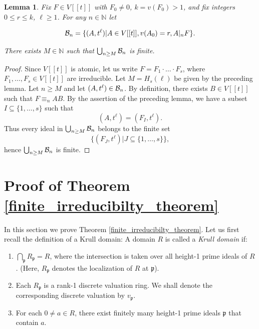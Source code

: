 \documentclass{article}
\newcommand{\N}{\mathbb{N}}
\newcommand{\st}{{|}}
\newcommand{\frp}{\mathfrak{p}}
\theoremstyle{plain}
\newtheorem{lemma}[theorem]{Lemma}
\theoremstyle{definition}
\theoremstyle{remark}
\theoremstyle{plain}
\begin{document}
\begin{lemma}\label{local_bound} Fix $F \in V[[t]]$ with $F_0 \neq 0$, $k = v(F_0) > 1$, and fix  integers $0 \leq r  \leq k$, $\ell \geq 1$. For any $n \in \N$ let 

$${\cal{B}}_n = \{(A,t^\ell) \st A\in V[[t]], v(A_0) = r, A|_nF\}.$$

There exists $M \in \N$ such that $\bigcup_{n \geq M}{\cal{B}}_n$ is finite. \end{lemma}
\begin{proof}
    Since $V[[t]]$ is atomic, let us write $F = F_1\cdot \ldots \cdot F_s$, where $F_1,\ldots,F_s \in V[[t]]$ are irreducible. Let $M = H_s(\ell)$ be given by the preceding lemma. Let $n \geq M$ and let $(A,t^\ell) \in {\cal{B}}_n$. By definition, there exists $B \in V[[t]]$ such that $F \equiv_n AB$. By the assertion of the preceding lemma, we have a subset $I \subseteq \{1,\ldots,s\}$ such that $$(A,t^\ell) = (F_I,t^\ell).$$ Thus every ideal in $\bigcup_{n \geq M}{\cal{B}}_n$ belongs to the finite set $$\{(F_J,t^\ell) \st J \subseteq \{1,\ldots,s\}\},$$  hence $\bigcup_{n \geq M}{\cal{B}}_n$ is finite. 
    
\end{proof}

\section{Proof of Theorem \ref{finite_irreducibilty_theorem}}\label{sec:krull_proof}

In this section we prove Theorem \ref{finite_irreducibilty_theorem}. Let us first recall the definition of a Krull domain: A domain $R$ is called a {\it Krull domain} if:
\begin{enumerate}
    \item $\bigcap_{\frp} R_\frp = R$, where the intersection is taken over all height-1 prime ideals of $R$. (Here, $R_\frp$ denotes the localization of $R$ at $\frp$).
    \item Each $R_\frp$ is a rank-1 discrete valuation ring. We shall denote the corresponding discrete valuation by $v_\frp$. 
    \item For each $0 \neq a \in R$, there exist finitely many height-1 prime ideals $\frp$ that contain $a$.
\end{enumerate}
\end{document}
